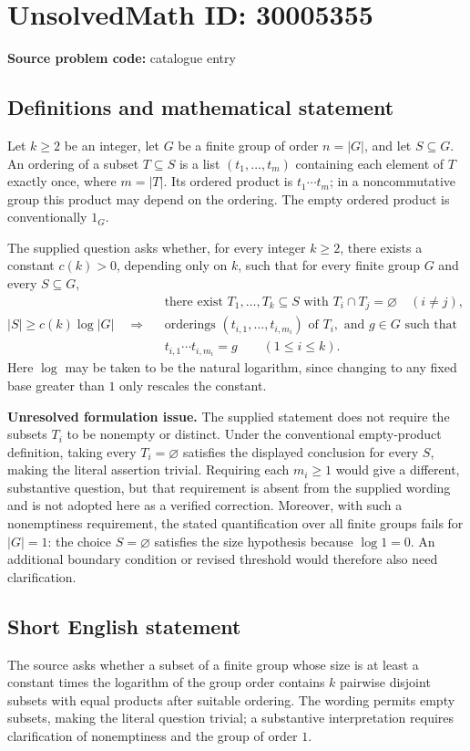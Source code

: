 \documentclass[11pt]{article}
\begin{document}
\section*{UnsolvedMath ID: 30005355}
\textbf{Source problem code:} catalogue entry
\subsection{Definitions and mathematical statement}
Let \(k\geq 2\) be an integer, let \(G\) be a finite group of order \(n=|G|\), and let \(S\subseteq G\). An ordering of a subset \(T\subseteq S\) is a list \((t_1,\ldots,t_m)\) containing each element of \(T\) exactly once, where \(m=|T|\). Its ordered product is \(t_1\cdots t_m\); in a noncommutative group this product may depend on the ordering. The empty ordered product is conventionally \(1_G\).

The supplied question asks whether, for every integer \(k\geq 2\), there exists a constant \(c(k)>0\), depending only on \(k\), such that for every finite group \(G\) and every \(S\subseteq G\),
\[
 |S|\geq c(k)\log |G|
 \quad\Longrightarrow\quad
 \begin{gathered}
 \text{there exist }T_1,\ldots,T_k\subseteq S
 \text{ with }T_i\cap T_j=\varnothing\quad(i\neq j),\\
 \text{orderings }(t_{i,1},\ldots,t_{i,m_i})\text{ of }T_i,
 \text{ and }g\in G\text{ such that}\\
 t_{i,1}\cdots t_{i,m_i}=g\qquad(1\leq i\leq k).
 \end{gathered}
\]
Here \(\log\) may be taken to be the natural logarithm, since changing to any fixed base greater than \(1\) only rescales the constant.

\textbf{Unresolved formulation issue.} The supplied statement does not require the subsets \(T_i\) to be nonempty or distinct. Under the conventional empty-product definition, taking every \(T_i=\varnothing\) satisfies the displayed conclusion for every \(S\), making the literal assertion trivial. Requiring each \(m_i\geq 1\) would give a different, substantive question, but that requirement is absent from the supplied wording and is not adopted here as a verified correction. Moreover, with such a nonemptiness requirement, the stated quantification over all finite groups fails for \(|G|=1\): the choice \(S=\varnothing\) satisfies the size hypothesis because \(\log 1=0\). An additional boundary condition or revised threshold would therefore also need clarification.
\subsection{Short English statement}
The source asks whether a subset of a finite group whose size is at least a constant times the logarithm of the group order contains \(k\) pairwise disjoint subsets with equal products after suitable ordering. The wording permits empty subsets, making the literal question trivial; a substantive interpretation requires clarification of nonemptiness and the group of order \(1\).
\end{document}
